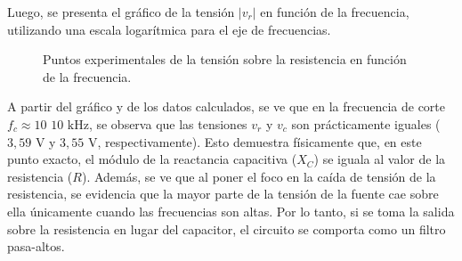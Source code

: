 \documentclass{article}
\begin{document}
        
        Luego, se presenta el gráfico de la tensión $|v_r|$ en función de la frecuencia, utilizando una escala logarítmica para el eje de frecuencias.
        
\begin{figure}[H]
    \centering
    \caption{Puntos experimentales de la tensión sobre la resistencia en función de la frecuencia.}
    \label{fig:vr_grafico_puntos}
\end{figure}
        A partir del gráfico y de los datos calculados, se ve que en la frecuencia de corte $f_c \approx 10\text{ 10 kHz}$, se observa que las tensiones $v_r$ y $v_c$ son prácticamente iguales ($3,59\text{ V}$ y $3,55\text{ V}$, respectivamente). Esto demuestra físicamente que, en este punto exacto, el módulo de la reactancia capacitiva ($X_C$) se iguala al valor de la resistencia ($R$).
        Además, se ve que al poner el foco en la caída de tensión de la resistencia, se evidencia que la mayor parte de la tensión de la fuente cae sobre ella únicamente cuando las frecuencias son altas. Por lo tanto, si se toma la salida sobre la resistencia en lugar del capacitor, el circuito se comporta como un filtro pasa-altos.
\end{document}
